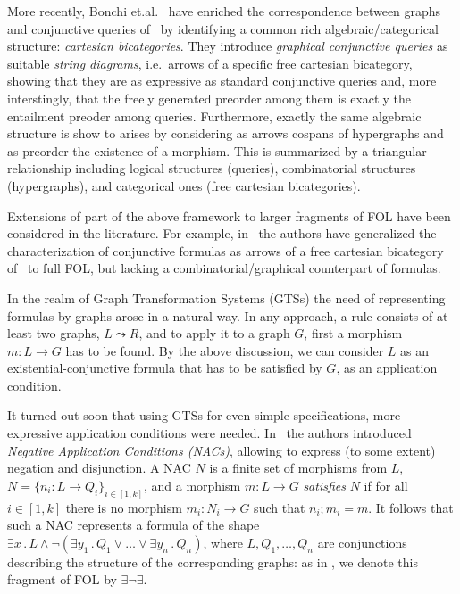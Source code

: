 More recently, Bonchi et.al.~\cite{DBLP:conf/csl/BonchiSS18} have enriched the correspondence between graphs and conjunctive queries of~\cite{DBLP:conf/stoc/ChandraM77} by identifying a common rich algebraic/categorical structure: \emph{cartesian bicategories}. They introduce \emph{graphical conjunctive queries} as suitable \emph{string diagrams}, i.e.~arrows of a specific free cartesian bicategory, showing that they are as expressive as standard conjunctive queries and, more interstingly, that the freely generated preorder among them is exactly the entailment preoder among queries. Furthermore, exactly the same algebraic structure is show to arises by considering as arrows cospans of hypergraphs and as preorder the existence of a morphism. This is summarized by a triangular relationship including logical structures (queries), combinatorial structures (hypergraphs), and categorical ones (free cartesian bicategories).     

Extensions of part of the above framework to larger fragments of FOL have been considered in the literature. For example, in~\cite{DBLP:journals/corr/abs-2404-18795} the authors have generalized the characterization of conjunctive formulas as arrows of a free cartesian bicategory of~\cite{DBLP:conf/csl/BonchiSS18} to full FOL, but lacking a combinatorial/graphical counterpart of formulas. 

In the realm of Graph Transformation Systems  (GTSs)
 the need of representing formulas by graphs arose in a natural way. 
 In any approach, a rule consists of at least two graphs, $L \leadsto R$, and to apply it to a graph $G$, first a morphism $m: L \to G$ has to be found. 
 By the above discussion, we can consider $L$ as an existential-conjunctive formula that has to be satisfied by $G$, as an application condition. 

 It turned out soon that using GTSs for even simple specifications, more expressive application conditions 
 were needed. 
 In~\cite{NegativeAC} the authors introduced \emph{Negative Application Conditions (NACs)}, allowing to express (to some extent) negation and disjunction.  A NAC $N$ is  a finite set of morphisms from $L$, $N = \{n_i: L \to Q_i\}_{i\in[1,k]}$, and a morphism $m: L \to G$ \emph{satisfies} $N$ if for all $i\in[1,k]$ there is no morphism $m_i: N_i \to G$ such that $n_i;m_i = m$. 
 It follows that such a NAC represents a formula of the shape $\exists \overline{x}\,.\, L \wedge \neg (\exists \overline{y}_1\,.\, Q_1 \vee \ldots \vee \exists \overline{y}_n\,.\, Q_n)$, where $L, Q_1, \ldots,Q_n$ are conjunctions describing the structure of the corresponding graphs: as in \cite{Rensink-FOL}, we denote this fragment of FOL by $\exists \neg \exists$.

